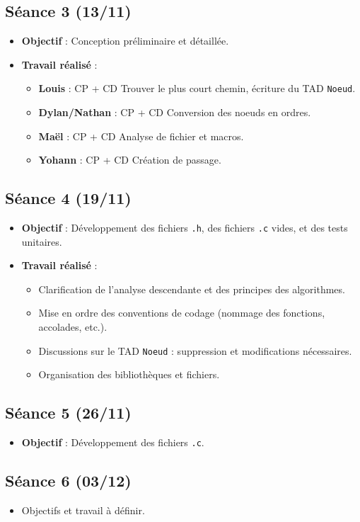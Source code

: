 \documentclass[a4paper,12pt]{article}
\begin{document}
\subsection{Séance 3 (13/11)}
\begin{itemize}
    \item \textbf{Objectif} : Conception préliminaire et détaillée.
    \item \textbf{Travail réalisé} :
    \begin{itemize}
        \item \textbf{Louis} : CP + CD Trouver le plus court chemin, écriture du TAD \texttt{Noeud}.
        \item \textbf{Dylan/Nathan} : CP + CD Conversion des noeuds en ordres.
        \item \textbf{Maël} : CP + CD Analyse de fichier et macros.
        \item \textbf{Yohann} : CP + CD Création de passage.
    \end{itemize}
\end{itemize}

\subsection{Séance 4 (19/11)}
\begin{itemize}
    \item \textbf{Objectif} : Développement des fichiers \texttt{.h}, des fichiers \texttt{.c} vides, et des tests unitaires.
    \item \textbf{Travail réalisé} :
    \begin{itemize}
        \item Clarification de l'analyse descendante et des principes des algorithmes.
        \item Mise en ordre des conventions de codage (nommage des fonctions, accolades, etc.).
        \item Discussions sur le TAD \texttt{Noeud} : suppression et modifications nécessaires.
        \item Organisation des bibliothèques et fichiers.
    \end{itemize}
\end{itemize}

\subsection{Séance 5 (26/11)}
\begin{itemize}
    \item \textbf{Objectif} : Développement des fichiers \texttt{.c}.
\end{itemize}

\subsection{Séance 6 (03/12)}
\begin{itemize}
    \item Objectifs et travail à définir.
\end{itemize}
\end{document}
